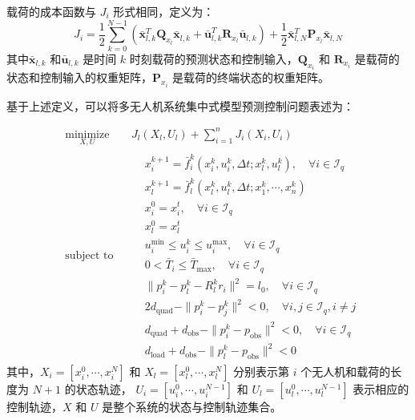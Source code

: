 \documentclass[lang=chs, degree=master, blindreview=false, winfonts=true]{yanputhesis}
\begin{document}
载荷的成本函数与 \( J_i \) 形式相同，定义为：
\begin{equation}
    J_i = \frac{1}{2}\sum_{k=0}^{N-1}\left(\bar{\boldsymbol{x}}_{l,k}^T\boldsymbol{Q}_{x_l}\bar{\boldsymbol{x}}_{l,k}+\bar{\boldsymbol{u}}_{l,k}^T\boldsymbol{R}_{x_l}\bar{\boldsymbol{u}}_{l,k}\right)+\frac{1}{2}\bar{\boldsymbol{x}}_{l,N}^T\boldsymbol{P}_{x_l}\bar{\boldsymbol{x}}_{l,N}
	\label{jpayload}
\end{equation}
其中$\bar{\boldsymbol{x}}_{l,k}$ 和$\bar{\boldsymbol{u}}_{l,k}$ 是时间 $k$ 时刻载荷的预测状态和控制输入，$\boldsymbol{Q}_{x_i}$ 和 $\boldsymbol{R}_{x_i}$ 是载荷的状态和控制输入的权重矩阵，$\boldsymbol{P}_{x_i}$ 是载荷的终端状态的权重矩阵。


基于上述定义，可以将多无人机系统集中式模型预测控制问题表述为：

\begin{equation}
	\begin{aligned} 
	&\operatorname*{minimize}_{X,U}& & J_l(X_l, U_l) + \sum_{i=1}^n J_i(X_i, U_i)  \\
	&\text{subject to}& & \begin{aligned}
& x_i^{k+1} = \bar{f}_i^k(x_i^k, u_i^k, \Delta t; x_l^k, u_l^k), \quad \forall i \in \mathcal{I}_q \\
& x_l^{k+1} = \bar{f}_l^k(x_l^k, u_l^k, \Delta t; x_1^k, \cdots, x_n^k) \\
& x_i^0 = x_i^t, \quad \forall i \in \mathcal{I}_q \\
& x_l^0 = x_l^t \\
& u_i^{\min} \leq u_i^k \leq u_i^{\max}, \quad \forall i \in \mathcal{I}_q \\
& 0 < \bar{T}_i \leq \bar{T}_{\max}, \quad \forall i \in \mathcal{I}_q \\
& \|p_i^k - p_l^k - R_l^k r_i\|^2 = l_0, \quad \forall i \in \mathcal{I}_q \\
& 2d_\text{quad} - \|p_i^k - p_j^k\|^2 < 0, \quad \forall i, j \in \mathcal{I}_q, i \neq j \\
& d_\text{quad} + d_\text{obs} - \|p_i^k - p_\text{obs}\|^2 < 0, \quad \forall i \in \mathcal{I}_q \\
& d_\text{load} + d_\text{obs} - \|p_l^k - p_\text{obs}\|^2 < 0        
	\end{aligned}	
\end{aligned}
\label{multimpc}
\end{equation}
其中，\( X_i = \left[ x_i^0, \cdots, x_i^N \right] \) 和 \( X_l = \left[ x_l^0, \cdots, x_l^N \right] \) 分别表示第 \( i \) 个无人机和载荷的长度为 \( N+1 \) 的状态轨迹，
\( U_i = \left[ u_i^0, \cdots, u_i^{N-1} \right] \) 和 \( U_l = \left[ u_l^0, \cdots, u_l^{N-1} \right] \) 表示相应的控制轨迹，\( X \) 和 \( U \) 是整个系统的状态与控制轨迹集合。
\end{document}
